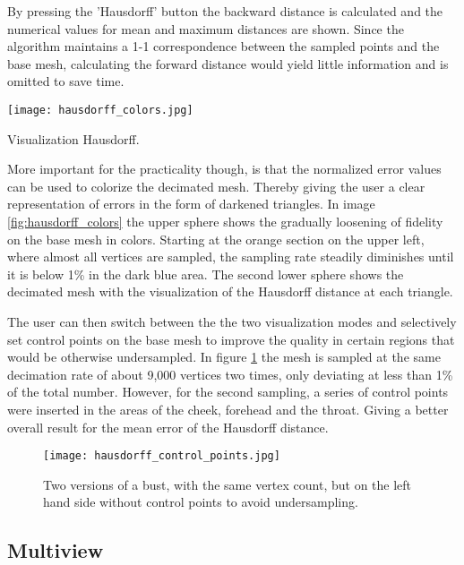 By pressing the 'Hausdorff' button the backward distance is calculated and the numerical values for mean and maximum distances are shown.
Since the algorithm maintains a 1-1 correspondence between the sampled points and the base mesh, calculating the forward distance would yield little information and is omitted to save time.
\begin{floatingfigure}[r]{0.31\textwidth}
\center
\texttt{[image: hausdorff\_colors.jpg]}
\caption{Visualization Hausdorff.}
\label{fig:hausdorff_colors}
\end{floatingfigure}
More important for the practicality though, is that the normalized error values can be used to colorize the decimated mesh.
Thereby giving the user a clear representation of errors in the form of darkened triangles.
In image \ref{fig:hausdorff_colors} the upper sphere shows the gradually loosening of fidelity on the base mesh in colors.
Starting at the orange section on the upper left, where almost all vertices are sampled, the sampling rate steadily diminishes until it is below 1\% in the dark blue area.
The second lower sphere shows the decimated mesh with the visualization of the Hausdorff distance at each triangle.

The user can then switch between the the two visualization modes and selectively set control points on the base mesh to improve the quality in certain regions that would be otherwise undersampled.
In figure \ref{fig:hausdorff_control_points} the mesh is sampled at the same decimation rate of about 9,000 vertices two times, only deviating at less than 1\% of the total number.
However, for the second sampling, a series of control points were inserted in the areas of the cheek, forehead and the throat.
Giving a better overall result for the mean error of the Hausdorff distance.
\begin{figure}[ht]
\centering
\texttt{[image: hausdorff\_control\_points.jpg]}
\caption{Two versions of a bust, with the same vertex count, but on the left hand side without control points to avoid undersampling.}
\label{fig:hausdorff_control_points}
\end{figure}

\subsection{Multiview}
\label{topstoc52}

